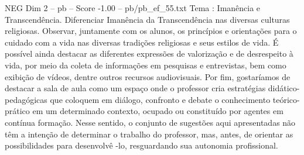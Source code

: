\begin{textsample}{NEG Dim 2 – pb – Score -1.00 – pb/pb\_ef\_55.txt}
Tema : Imanência e Transcendência.
Diferenciar Imanência da Transcendência nas diversas culturas religiosas.
Observar, juntamente com os alunos, os princípios e orientações para o cuidado com a vida nas diversas tradições religiosas e seus estilos de vida.
É possível ainda destacar as diferentes expressões de valorização e de desrespeito à vida, por meio da coleta de informações em pesquisas e entrevistas, bem como exibição de vídeos, dentre outros recursos audiovisuais.
Por fim, gostaríamos de destacar a sala de aula como um espaço onde o professor cria estratégias didático-pedagógicas que coloquem em diálogo, confronto e debate o conhecimento teórico-prático em um determinado contexto, ocupado ou constituído por agentes em contínua formação.
Nesse sentido, o conjunto de sugestões aqui apresentadas não têm a intenção de determinar o trabalho do professor, mas, antes, de orientar as possibilidades para desenvolvê -lo, resguardando sua autonomia profissional.

\end{textsample}
